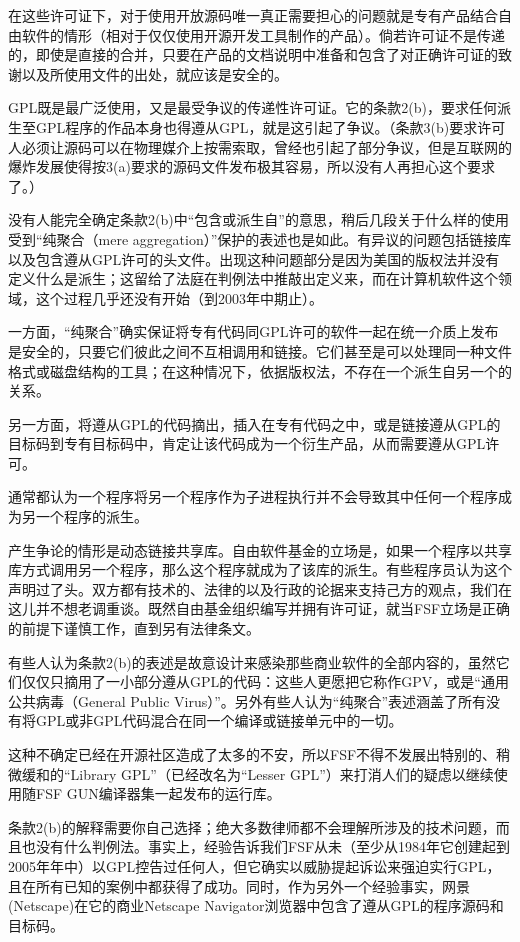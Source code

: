 \documentclass[12pt,oneside]{book}
\begin{document}
在这些许可证下，对于使用开放源码唯一真正需要担心的问题就是专有产品结合自由软件的情形（相对于仅仅使用开源开发工具制作的产品）。倘若许可证不是传递的，即使是直接的合并，只要在产品的文档说明中准备和包含了对正确许可证的致谢以及所使用文件的出处，就应该是安全的。

GPL既是最广泛使用，又是最受争议的传递性许可证。它的条款2(b)，要求任何派生至GPL程序的作品本身也得遵从GPL，就是这引起了争议。（条款3(b)要求许可人必须让源码可以在物理媒介上按需索取，曾经也引起了部分争议，但是互联网的爆炸发展使得按3(a)要求的源码文件发布极其容易，所以没有人再担心这个要求了。）

没有人能完全确定条款2(b)中“包含或派生自”的意思，稍后几段关于什么样的使用受到“纯聚合（mere aggregation）”保护的表述也是如此。有异议的问题包括链接库以及包含遵从GPL许可的头文件。出现这种问题部分是因为美国的版权法并没有定义什么是派生；这留给了法庭在判例法中推敲出定义来，而在计算机软件这个领域，这个过程几乎还没有开始（到2003年中期止）。

一方面，“纯聚合”确实保证将专有代码同GPL许可的软件一起在统一介质上发布是安全的，只要它们彼此之间不互相调用和链接。它们甚至是可以处理同一种文件格式或磁盘结构的工具；在这种情况下，依据版权法，不存在一个派生自另一个的关系。

另一方面，将遵从GPL的代码摘出，插入在专有代码之中，或是链接遵从GPL的目标码到专有目标码中，肯定让该代码成为一个衍生产品，从而需要遵从GPL许可。

通常都认为一个程序将另一个程序作为子进程执行并不会导致其中任何一个程序成为另一个程序的派生。

产生争论的情形是动态链接共享库。自由软件基金的立场是，如果一个程序以共享库方式调用另一个程序，那么这个程序就成为了该库的派生。有些程序员认为这个声明过了头。双方都有技术的、法律的以及行政的论据来支持己方的观点，我们在这儿并不想老调重谈。既然自由基金组织编写并拥有许可证，就当FSF立场是正确的前提下谨慎工作，直到另有法律条文。

有些人认为条款2(b)的表述是故意设计来感染那些商业软件的全部内容的，虽然它们仅仅只摘用了一小部分遵从GPL的代码：这些人更愿把它称作GPV，或是“通用公共病毒（General Public Virus）”。另外有些人认为“纯聚合”表述涵盖了所有没有将GPL或非GPL代码混合在同一个编译或链接单元中的一切。

这种不确定已经在开源社区造成了太多的不安，所以FSF不得不发展出特别的、稍微缓和的“Library GPL”（已经改名为“Lesser GPL”）来打消人们的疑虑以继续使用随FSF GUN编译器集一起发布的运行库。

条款2(b)的解释需要你自己选择；绝大多数律师都不会理解所涉及的技术问题，而且也没有什么判例法。事实上，经验告诉我们FSF从未（至少从1984年它创建起到2005年年中）以GPL控告过任何人，但它确实以威胁提起诉讼来强迫实行GPL，且在所有已知的案例中都获得了成功。同时，作为另外一个经验事实，网景(Netscape)在它的商业Netscape Navigator浏览器中包含了遵从GPL的程序源码和目标码。
\end{document}
